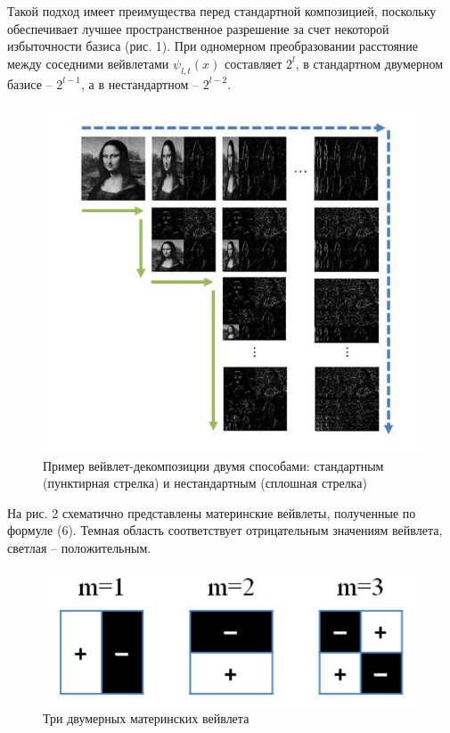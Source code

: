 Такой подход имеет преимущества перед стандартной композицией, поскольку обеспечивает лучшее пространственное разрешение за счет некоторой избыточности базиса (рис. 1). При одномерном преобразовании расстояние между соседними вейвлетами $\psi_{l,t}(x)$ составляет $2^l$, в стандартном двумерном базисе -- $2^{l-1}$, а в нестандартном -- $2^{l-2}$.

\begin{figure}[h!]
\centering
\includegraphics[scale=0.6]{res/pic001}
\caption{Пример вейвлет-декомпозиции двумя способами: стандартным (пунктирная стрелка) и нестандартным (сплошная стрелка)}
\end{figure}

На рис. 2 схематично представлены материнские вейвлеты, полученные по формуле (6). Темная область соответствует отрицательным значениям вейвлета, светлая -- положительным.

\begin{figure}[h!]
\centering
\includegraphics[scale=0.6]{res/pic002}
\caption{Три двумерных материнских вейвлета}
\end{figure}

